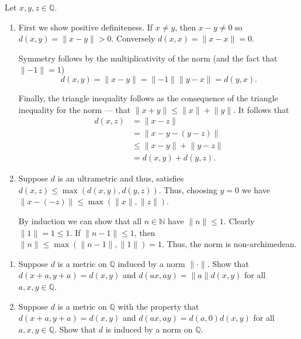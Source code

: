 \documentclass[12 pt, letterpaper]{hmcpset}
\begin{document}
\begin{solution}
	Let $x, y, z \in \mathbb{Q}$.
	\begin{enumerate}
		\item First we show positive definiteness. If $x \neq y$, then $x - y \neq 0$ so $d(x, y) = \lVert x - y \rVert > 0$. Conversely  $d(x, x) = \lVert x - x \rVert = 0$.

			Symmetry follows by the multiplicativity of the norm (and the fact that $\lVert -1 \rVert = 1$)
			\[
				d(x, y) = \lVert x - y \rVert = \lVert -1 \rVert \lVert y - x \rVert = d(y, x).
			\]

			Finally, the triangle inequality follows as the consequence of the triangle inequality for the norm --- that $\lVert x + y \rVert \le \lVert x \rVert + \lVert y \rVert$. It follows that
			\begin{align*}
				d(x, z) & = \lVert x - z \rVert \\
					& = \lVert x - y - (y - z) \rVert \\
					& \le \lVert x - y \rVert + \lVert y - z \rVert \\
					& = d(x, y) + d(y, z).
			\end{align*}

		\item Suppose $d$ is an ultrametric and thus, satisfies $d(x, z) \le \max (d(x, y), d(y, z))$. Thus, choosing $y = 0$ we have $\lVert x - (-z) \rVert \le \max(\lVert x \rVert, \lVert z \rVert)$.

			By induction we can show that all $n \in \mathbb{N}$ have $\lVert n \rVert \le 1$. Clearly  $\lVert 1 \rVert = 1 \le 1$. If $\lVert n - 1 \rVert \le 1$, then $\lVert n \rVert \le \max(\lVert n - 1 \rVert, \lVert 1 \rVert) = 1$. Thus, the norm is non-archimedean.
	\end{enumerate}
\end{solution}

\pagebreak

\begin{problem}[(6)]
	\begin{enumerate}
		\item Suppose $d$ is a metric on $\mathbb{Q}$ induced by a norm $\lVert \cdot \rVert$. Show that $d(x + a, y + a) = d(x, y)$ and $d(ax, ay) = \lVert a \rVert d(x, y)$ for all $a, x, y \in \mathbb{Q}$.

		\item Suppose $d$ is a metric on $\mathbb{Q}$ with the property that $d(x + a, y + a) = d(x, y)$ and $d(ax, ay) = d(a, 0) d(x, y)$ for all $a, x, y \in \mathbb{Q}$. Show that $d$ is induced by a norm on $\mathbb{Q}$.
	\end{enumerate}
\end{problem}
\end{document}

